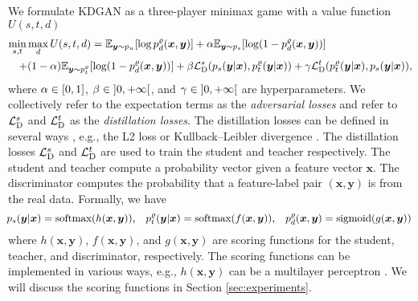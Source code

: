 \documentclass{article}
\newcommand{\OVEC}[1]{\bm{#1}} %
\newcommand{\LOSS}[2]{\mathcal{#1}_{\rm{#2}}} %
\newcommand{\EXP}{\mathbb{E}} %
\newcommand{\kdganfullobj}{U(s,t,d)}
\newcommand{\kdganmin}{\min_{s,t}}
\newcommand{\kdganmax}{\max_{d}}
\newcommand{\stddistloss}{\LOSS{L}{D}^{s}}
\newcommand{\tchdistloss}{\LOSS{L}{D}^{t}}
\newcommand{\abbrpdat}{p_{u}}
\newcommand{\abbrpstd}{p_{s}}
\newcommand{\fullpstd}[1]{p_{s}(#1|\OVEC{x})}
\newcommand{\abbrptch}{p_{t}^{\varrho}}
\newcommand{\fullptch}[1]{p_{t}^{\varrho}(#1|\OVEC{x})}
\newcommand{\fullpdis}[1]{p_{d}^{\varrho}(\OVEC{x},#1)}
\newcommand{\stdscore}{h(\OVEC{x},\OVEC{y})}
\newcommand{\tchscore}{f(\OVEC{x},\OVEC{y})}
\newcommand{\disscore}{g(\OVEC{x},\OVEC{y})}
\begin{document}
We formulate KDGAN as a three-player minimax game with a value function $\kdganfullobj$
\begin{equation} \label{equ:objective function}
\hspace*{-0.01cm}
\begin{aligned}
\kdganmin
\kdganmax
\kdganfullobj
=
\EXP_{\OVEC{y}\sim\abbrpdat}[\log\fullpdis{\OVEC{y}}]
&
+
\alpha\EXP_{\OVEC{y}\sim\abbrpstd}[\log(1-\fullpdis{\OVEC{y}})]
\\
+
(1-\alpha)
\EXP_{\OVEC{y}\sim\abbrptch}[\log(1-\fullpdis{\OVEC{y}})]
+
\beta
&
\stddistloss(\fullpstd{\OVEC{y}},\fullptch{\OVEC{y}})
+
\gamma
\tchdistloss(\fullptch{\OVEC{y}},\fullpstd{\OVEC{y}})
\text{,}
\\
\end{aligned}
\end{equation}%
where $\alpha\in\interval{0}{1}$, $\beta\in\interval[open left, open right]{0}{+\infty}$, and $\gamma\in\interval[open left, open right]{0}{+\infty}$ are hyperparameters.
We collectively refer to the expectation terms as the \emph{adversarial losses} and refer to $\stddistloss$ and $\tchdistloss$ as the \emph{distillation losses}.
The distillation losses can be defined in several ways \cite{hinton2015distilling,sau2016deep}, e.g., the L2 loss \cite{ba2014deep} or Kullback–Leibler divergence \cite{hinton2015distilling}.
The distillation losses $\stddistloss$ and $\tchdistloss$ are used to train the student and teacher respectively.
The student and teacher compute a probability vector given a feature vector $\OVEC{x}$.
The discriminator computes the probability that a feature-label pair $(\OVEC{x},\OVEC{y})$ is from the real data.
Formally, we have
\begin{equation}
\hspace*{-0.08cm}
\fullpstd{\OVEC{y}}=\text{softmax}(\stdscore)
\text{,}\quad
\fullptch{\OVEC{y}}=\text{softmax}(\tchscore)
\text{,}\quad
\fullpdis{\OVEC{y}}=\text{sigmoid}(\disscore)
\end{equation}
where $\stdscore$, $\tchscore$, and $\disscore$ are scoring functions for the student, teacher, and discriminator, respectively.
The scoring functions can be implemented in various ways, e.g., $\stdscore$ can be a multilayer perceptron \cite{lecun1998gradient}.
We will discuss the scoring functions in Section \ref{sec:experiments}.
\end{document}
